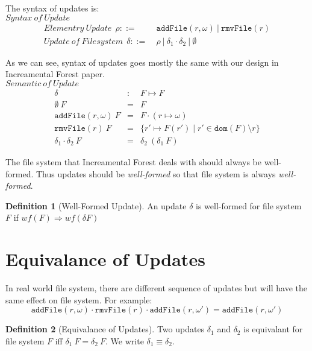 \documentclass[10pt,twoside,a4paper]{article}
\theoremstyle{theorem}
\theoremstyle{lemma}
\theoremstyle{property}
\theoremstyle{definition}
\newtheorem{definition}{Definition}[section]
\theoremstyle{assumption}
\begin{document}
The syntax of updates is:\\

$\boxed{Syntax ~of ~Update}$
\begin{align*}
	Elementry ~Update ~~\rho ::= & ~\mathtt{addFile}(r,\omega) ~|~ \mathtt{rmvFile}(r) \\
	Update~of~Filesystem ~~\delta ::= & ~\rho ~|~ \delta_1 \cdot \delta_2 ~|~ \emptyset
\end{align*}

As we can see, syntax of updates goes mostly the same with our design in Increamental Forest paper.
\\


$\boxed{Semantic~of~Update}$
\begin{eqnarray*}
	\delta & : & F \mapsto F\\
	\emptyset ~F & = & F\\
	\mathtt{addFile}(r,\omega) ~F & = & F \cdot (r \mapsto \omega)\\
	\mathtt{rmvFile}(r) ~F & = & \{r' \mapsto F(r') \mid r' \in \mathtt{dom}(F) \setminus {r}\}\\
	\delta_1 \cdot \delta_2 ~F & = & \delta_2 ~(\delta_1 ~F)
\end{eqnarray*}

\newpage

The file system that Increamental Forest deals with should always be well-formed. 
Thus updates should be \emph{well-formed} so that file system is always \emph{well-formed}.

\begin{definition}[Well-Formed Update]
	An update $\delta$ is well-formed for file system $F$ if $wf(F) \Rightarrow wf(\delta F)$
\end{definition}

\section{Equivalance of Updates}

In real world file system, there are different sequence of updates but will have the same effect on file system. For example:
\begin{displaymath}
	\mathtt{addFile}(r, \omega) \cdot \mathtt{rmvFile}(r) \cdot \mathtt{addFile}(r, \omega') = \mathtt{addFile}(r, \omega')
\end{displaymath}

\begin{definition}[Equivalance of Updates]
	Two updates $\delta_1$ and $\delta_2$ is equivalant for file system $F$ iff $\delta_1 ~F = \delta_2 ~F$. We write $\delta_1 \equiv \delta_2$.
\end{definition}
\end{document}
